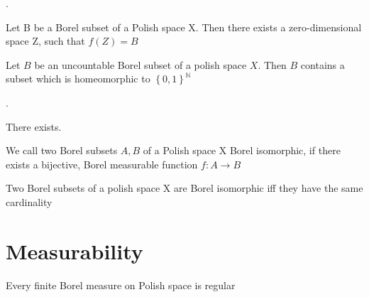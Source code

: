 \documentclass[10pt, a4paper, titlepage]{article}
\numberwithin{equation}{section}
\begin{document}
\begin{definition}
	.	
\end{definition}

\begin{theorem}
	Let B be a Borel subset of a Polish space X. Then there exists a zero-dimensional space Z, such that $f(Z) = B$
\end{theorem}

\begin{theorem}
	Let $B$ be an uncountable Borel subset of a polish space  $X$. Then  $B$ contains a subset which is homeomorphic to  $\left\{ 0,1 \right\}^\mathbb{N}$
	
\end{theorem}


\begin{theorem}
	.
\end{theorem}

\begin{theorem}
	There exists.
\end{theorem}

\begin{definition}
	We call two Borel subsets $A,B$ of a Polish space X Borel isomorphic, if there exists a bijective, Borel measurable function $f: A \to B$
\end{definition}


\begin{theorem}
	Two Borel subsets of a polish space X are Borel isomorphic iff they have the same cardinality
\end{theorem}




\section{Measurability}

\begin{definition}[$\mu$-Measurable]
	
\end{definition}

\begin{definition}
	
\end{definition}

\begin{theorem}
	Every finite Borel measure on Polish space is regular
\end{theorem}
\end{document}
